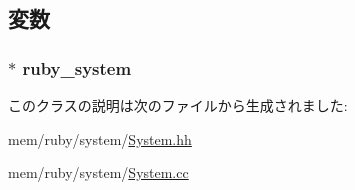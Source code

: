\subsection{変数}
\hypertarget{classRubySystem_1_1RubyEvent_a88928242e9a532cb6f4abe42dd8240a7}{
\subsubsection[{ruby\_\-system}]{$\ast$ {\bf ruby\_\-system}}}
\label{classRubySystem_1_1RubyEvent_a88928242e9a532cb6f4abe42dd8240a7}


このクラスの説明は次のファイルから生成されました:\begin{DoxyCompactItemize}
\item 
mem/ruby/system/\hyperlink{System_8hh}{System.hh}\item 
mem/ruby/system/\hyperlink{System_8cc}{System.cc}\end{DoxyCompactItemize}
